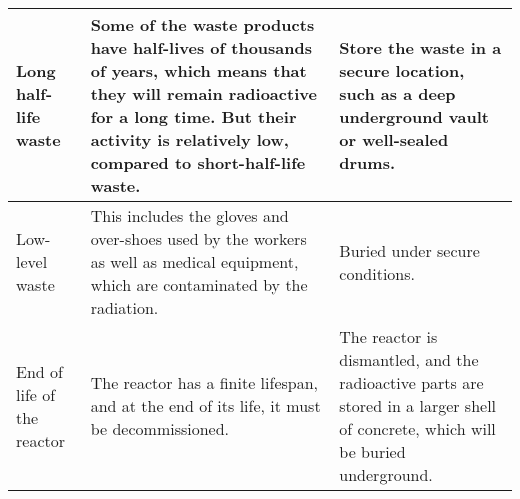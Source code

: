 \documentclass[a4paper,12pt]{article}
\begin{document}
\begin{longtable}{|p{}|p{}|p{}|}
  Long half-life waste                                                                                         & Some of the waste products have half-lives of thousands of years, which means that they will remain radioactive for a long time. But their activity is relatively low, compared to short-half-life waste.                & Store the waste in a secure location, such as a deep underground vault or well-sealed drums.                                                            \\ \hline
  Low-level waste                                                                                              & This includes the gloves and over-shoes used by the workers as well as medical equipment, which are contaminated by the radiation.                                                                                       & Buried under secure conditions.                                                                                                                         \\ \hline
  End of life of the reactor                                                                                   & The reactor has a finite lifespan, and at the end of its life, it must be decommissioned.                                                                                                                                & The reactor is dismantled, and the radioactive parts are stored in a larger shell of concrete, which will be buried underground.                        \\ \hline
\end{longtable}
\end{document}
